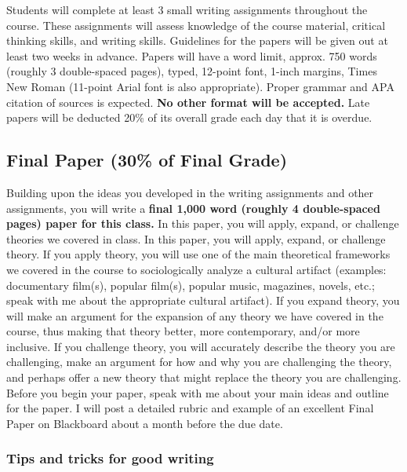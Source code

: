 \documentclass[11pt,]{article}
\begin{document}
Students will complete at least 3 small writing assignments throughout
the course. These assignments will assess knowledge of the course
material, critical thinking skills, and writing skills. Guidelines for
the papers will be given out at least two weeks in advance. Papers will
have a word limit, approx. 750 words (roughly 3 double-spaced pages),
typed, 12-point font, 1-inch margins, Times New Roman (11-point Arial
font is also appropriate). Proper grammar and APA citation of sources is
expected. \textbf{No other format will be accepted.} Late papers will be
deducted 20\% of its overall grade each day that it is overdue.

\hypertarget{final-paper-30-of-final-grade}{%
\subsection{Final Paper (30\% of Final
Grade)}\label{final-paper-30-of-final-grade}}

Building upon the ideas you developed in the writing assignments and
other assignments, you will write a \textbf{final 1,000 word (roughly 4
double-spaced pages) paper for this class.} In this paper, you will
apply, expand, or challenge theories we covered in class. In this paper,
you will apply, expand, or challenge theory. If you apply theory, you
will use one of the main theoretical frameworks we covered in the course
to sociologically analyze a cultural artifact (examples: documentary
film(s), popular film(s), popular music, magazines, novels, etc.; speak
with me about the appropriate cultural artifact). If you expand theory,
you will make an argument for the expansion of any theory we have
covered in the course, thus making that theory better, more
contemporary, and/or more inclusive. If you challenge theory, you will
accurately describe the theory you are challenging, make an argument for
how and why you are challenging the theory, and perhaps offer a new
theory that might replace the theory you are challenging. Before you
begin your paper, speak with me about your main ideas and outline for
the paper. I will post a detailed rubric and example of an excellent
Final Paper on Blackboard about a month before the due date.

\hypertarget{tips-and-tricks-for-good-writing}{%
\subsubsection{Tips and tricks for good
writing}\label{tips-and-tricks-for-good-writing}}
\end{document}
